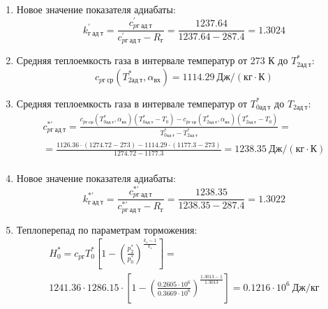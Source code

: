 \documentclass[a4paper,10pt]{article}
\begin{document}
\begin{enumerate}
        \item Новое значение показателя адиабаты:
        \[
            k_{г\ ад\ т}^\prime = \frac{c_{pг\ ад\ т}^\prime}{c_{pг\ ад\ т}^\prime - R_г} =
                \frac{
                    1237.64
                }{
                    1237.64 - 287.4
                }
            = 1.3024
        \]

        \item Средняя теплоемкость газа в интервале температур от 273 К до $T_{2ад\ т}^*$:
        \[
            c_{pг\ ср} (T_{2ад\ т}^*, \alpha_{вх}) =
            1114.29 \ Дж/(кг \cdot К)
        \]

        \item Средняя теплоемкость газа в интервале температур от $T_{0ад\ т}^*$ до $T_{2ад\ т}$:
        \begin{gather*}
            c_{pг\ ад\ т}^{*\prime} = \frac{
		        c_{pг\ ср}(T_{0ад\ т}^*, \alpha_{вх}) (T_{0ад\ т}^* - T_0) - c_{pг\ ср}(T_{2ад\ т}^*, \alpha_{вх}) (T_{2ад\ т}^* - T_0)
		    }{
		        T_{0ад\ т}^* - T_{2ад\ т}^*} =\\
            =\frac{
		        1126.36 \cdot
                (1274.72 - 273) -
		        1114.29 \cdot
                (1177.3 - 273)
		    }{
		        1274.72 - 1177.3} =
		    1238.35 \ Дж / (кг \cdot К)\\
        \end{gather*}

        \item Новое значение показателя адиабаты:
        \[
            k_{г\ ад\ т}^{*\prime} = \frac{c_{pг\ ад\ т}^{*\prime}}{c_{pг\ ад\ т}^{*\prime} - R_г} =
                \frac{
                    1238.35
                }{
                    1238.35 - 287.4
                }
            = 1.3022
        \]

        \item Теплоперепад по параметрам торможения:
        \begin{gather*}
            H_0^* = c_{pг} T_0^* \left[
                        1 - \left(
                                \frac{p_2^*}{p_0^*}
                            \right) ^
                        \frac{k_г - 1}{k_г}
                    \right] =\\
            1241.36 \cdot 1286.15 \cdot
                    \left[
                        1 - \left(
                                \frac{
                                    0.2605 \cdot 10^6
                                }{
                                    0.3669 \cdot 10^6
                                }
                            \right) ^
                        \frac{1.3013 - 1}{1.3013}
                    \right]
            = 0.1216 \cdot 10^6 \ Дж/кг\\
        \end{gather*}


\end{enumerate}
\end{document}
